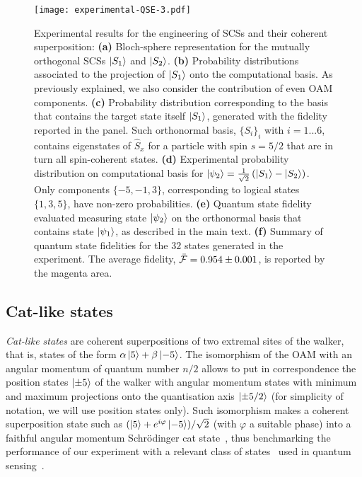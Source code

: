 \begin{figure}[tb]
\texttt{[image: experimental-QSE-3.pdf]}
\caption{
	Experimental results for the engineering of \acp{SCS} and their coherent superposition:
	\textbf{(a)} Bloch-sphere representation for the mutually orthogonal \acp{SCS} $\ket{S_1}$ and $\ket{S_2}$.
	\textbf{(b)} Probability distributions associated to the projection of $\ket{S_1}$ onto the computational basis. As previously explained, we also consider the contribution of even \ac{OAM} components.
	\textbf{(c)} Probability distribution corresponding to the basis that contains the target state itself $\ket{S_1}$, generated with the fidelity reported in the panel. Such orthonormal basis, $\{S_i\}_i$ with $i=1 ...6$, contains eigenstates of $\hat{S}_x$ for a particle with spin $s=5/2$ that are in turn all spin-coherent states.
	\textbf{(d)} Experimental probability distribution on computational basis for $\ket{\psi_2}=\frac{1}{\sqrt{2}}\left(\ket{S_1}- \ket{S_2} \right)$. Only components $\{-5, -1, 3\}$, corresponding to logical states $\{1,3,5\}$, have non-zero probabilities.
	\textbf{(e)} Quantum state fidelity evaluated measuring state $\ket{\psi_2}$ on the orthonormal basis that contains state $\ket{\psi_1}$, as described in the main text. 
	\textbf{(f)} Summary of quantum state fidelities for the $32$ states generated in the experiment. The average fidelity, $\bar{{\mathcal{F}}}=0.954\pm 0.001$, is reported by the magenta area.
}
\label{fig:VVBs:figSpin}
\end{figure}

\subsection{Cat-like states}
\label{subsec:expQWs:catstates}

\emph{Cat-like states} are coherent superpositions of two extremal sites of the walker, that is, states of the form $\alpha\ket{5}+\beta\ket{-5}$. The isomorphism of the \ac{OAM} with an angular momentum of quantum number $n/2$ allows to put in correspondence the position states $\ket{\pm 5}$ of the walker with angular momentum states with minimum and maximum projections onto the quantisation axis $\ket{\pm 5/2}$ (for simplicity of notation, we will use position states only). Such isomorphism makes a coherent superposition state such as $(\ket{5}+e^{i\varphi}\ket{-5})/\sqrt{2}$ (with $\varphi$ a suitable phase) into a faithful angular momentum Schrödinger cat state~\cite{militello2006distilling}, thus benchmarking the performance of our experiment with a relevant class of states~\cite{chandrashekar2008optimizing,zhang2016creating,majury2016robust} used in quantum sensing~\cite{fickler2012quantum,dambrosio2013photonic}.

